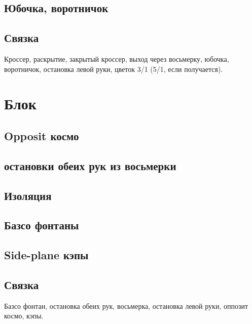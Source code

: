 \documentclass[a4paper, 12pt]{article}
\begin{document}
	\subsection{Юбочка, воротничок}
	\subsection{Связка}
	Кроссер, раскрытие, закрытый кроссер, выход через восьмерку, юбочка, воротничок, остановка левой руки, цветок 3/1 (5/1, если получается).
	
	\section{Блок}
	
	\subsection{Opposit космо}
	\subsection{остановки обеих рук из восьмерки}
	\subsection{Изоляция}
	\subsection{Базсо фонтаны}
	\subsection{Side-plane кэпы}
	\subsection{Связка}
	Базсо фонтан, остановка обеих рук, восьмерка, остановка левой руки, оппозит космо, кэпы.
	
	  
	
	
	
	
	
\end{document}
